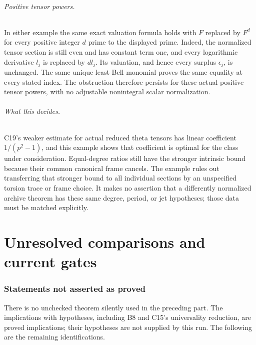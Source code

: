 \documentclass[11pt]{article}
\theoremstyle{definition}\newtheorem{definition}[theorem]{Definition}\newtheorem{remark}[theorem]{Remark}
\begin{document}
\paragraph{Positive tensor powers.}
In either example the same exact valuation formula holds
with $F$ replaced by $F^d$ for every positive integer $d$
prime to the displayed prime.  Indeed, the normalized
tensor section is still even and has constant term one,
and every logarithmic derivative $l_j$ is replaced by
$d l_j$.  Its valuation, and hence every surplus
$\epsilon_j$, is unchanged.  The same unique least
Bell monomial proves the same equality at every stated
index.  The obstruction therefore persists for these
actual positive tensor powers, with no adjustable
nonintegral scalar normalization.

\paragraph{What this decides.}
C19's weaker estimate for actual reduced theta tensors has
linear coefficient $1/(p^2-1)$, and this example shows that
coefficient is optimal for the class under consideration.
Equal-degree ratios still have the stronger intrinsic bound
because their common canonical frame cancels.
The example rules out transferring that stronger bound to
all individual sections by an unspecified torsion trace or
frame choice.  It makes no assertion that a differently
normalized archive theorem has these same degree, period,
or jet hypotheses; those data must be matched explicitly.


\part{Unresolved comparisons and current gates}
\section{Statements not asserted as proved}

There is no unchecked theorem silently used in the preceding part.
The implications with hypotheses, including B8 and C15's universality
reduction, are proved implications; their hypotheses are not supplied
by this run. The following are the remaining identifications.
\end{document}
